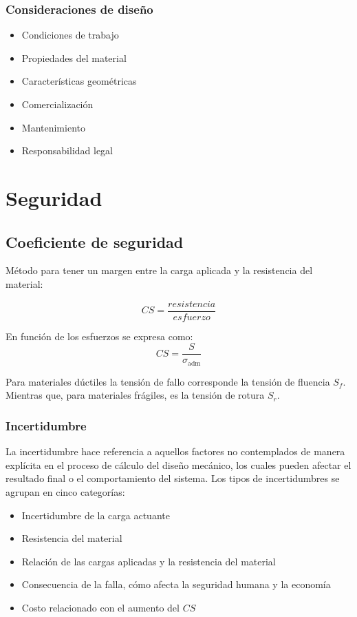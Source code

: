 \documentclass[spanish,11pt,a4paper]{article}
\begin{document}
	\subsubsection{Consideraciones de diseño}
	\begin{itemize}
		\item Condiciones de trabajo
		\item Propiedades del material
		\item Características geométricas
		\item Comercialización
		\item Mantenimiento
		\item Responsabilidad legal
	\end{itemize}
	
	\section{Seguridad}
	\subsection{Coeficiente de seguridad}
	Método para tener un margen entre la carga aplicada y la resistencia del material:
	
	\[CS = \dfrac{resistencia}{esfuerzo}\]
	
	En función de los esfuerzos se expresa como:
	\[CS =  \dfrac{S}{\sigma_\text{adm}}\]
	
	Para materiales dúctiles la tensión de fallo corresponde la tensión de fluencia $S_f$. Mientras que, para materiales frágiles, es la tensión de rotura $S_r$.
	
	\subsubsection{Incertidumbre}
	
	La incertidumbre hace referencia a aquellos factores no contemplados de manera explícita en el proceso de cálculo del diseño mecánico, los cuales pueden afectar el resultado final o el comportamiento del sistema. Los tipos de incertidumbres se agrupan en cinco categorías:
	\begin{itemize}
		\item Incertidumbre de la carga actuante
		\item Resistencia del material
		\item Relación de las cargas aplicadas y la resistencia del material
		\item Consecuencia de la falla, cómo afecta la seguridad humana y la economía
		\item Costo relacionado con el aumento del $CS$
	\end{itemize}
	
\end{document}
